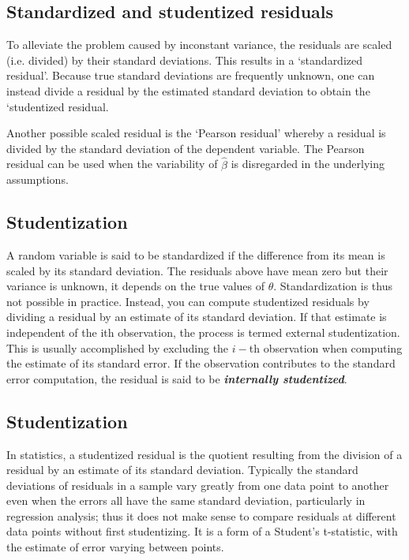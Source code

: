 \documentclass[Main.tex]{subfiles}
\begin{document}
\subsection{Standardized and studentized residuals} %

To alleviate the problem caused by inconstant variance, the residuals are scaled (i.e. divided) by their standard deviations. This results in a `standardized residual'. Because true standard deviations are frequently unknown, one can instead divide a residual by the estimated standard deviation to obtain the `studentized residual. 



Another possible scaled residual is the  `Pearson residual' whereby a residual is divided by the standard deviation of the dependent variable. The Pearson residual can be used when the variability of $\hat{\beta}$ is disregarded in the underlying assumptions.

\subsection{Studentization} %

A random variable is said to be standardized if the difference from its mean is scaled by its standard
deviation. The residuals above have mean zero but their variance is unknown, it depends on the true values
of $\theta$. Standardization is thus not possible in practice.
Instead, you can compute studentized residuals
by dividing a residual by an estimate of its standard deviation. If that estimate is independent of the ith
observation, the process is termed external studentization.
This is usually accomplished by excluding the
$i-$th observation when computing the estimate of its standard error. If the observation contributes to the
standard error computation, the residual is said to be \textbf{\emph{internally studentized}}.
\newpage
\subsection{Studentization}
In statistics, a studentized residual is the quotient resulting from the division of a residual by an estimate of its standard deviation. Typically the standard deviations of residuals in a sample vary greatly from one data point to another even when the errors all have the same standard deviation, particularly in regression analysis; thus it does not make sense to compare residuals at different data points without first studentizing. It is a form of a Student's t-statistic, with the estimate of error varying between points.
\end{document}
